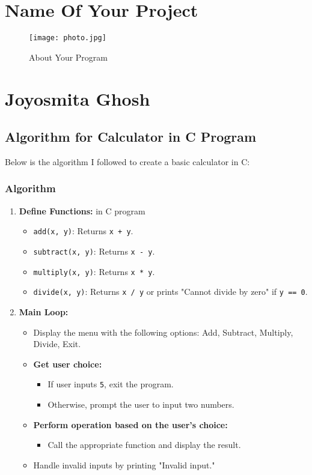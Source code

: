 \documentclass{article}
\begin{document}
\newpage
\section*{Name Of Your Project}
\begin{figure}[h!]
    \centering
\texttt{[image: photo.jpg]}
    \caption{About Your Program}
    \label{fig:image1}
\end{figure}

\newpage
\section{Joyosmita Ghosh}

\subsection{Algorithm for Calculator in C Program}

Below is the algorithm I followed to create a basic calculator in C:

\subsubsection*{Algorithm}

\begin{enumerate}
    \item \textbf{Define Functions:} in C program
    \begin{itemize}
        \item \texttt{add(x, y)}: Returns \texttt{x + y}.
        \item \texttt{subtract(x, y)}: Returns \texttt{x - y}.
        \item \texttt{multiply(x, y)}: Returns \texttt{x * y}.
        \item \texttt{divide(x, y)}: Returns \texttt{x / y} or prints "Cannot divide by zero" if \texttt{y == 0}.
    \end{itemize}
    
    \item \textbf{Main Loop:}
    \begin{itemize}
        \item Display the menu with the following options: Add, Subtract, Multiply, Divide, Exit.
        \item \textbf{Get user choice:}
        \begin{itemize}
            \item If user inputs \texttt{5}, exit the program.
            \item Otherwise, prompt the user to input two numbers.
        \end{itemize}
        \item \textbf{Perform operation based on the user's choice:}
        \begin{itemize}
            \item Call the appropriate function and display the result.
        \end{itemize}
        \item Handle invalid inputs by printing "Invalid input."
    \end{itemize}
\end{enumerate}
\end{document}
